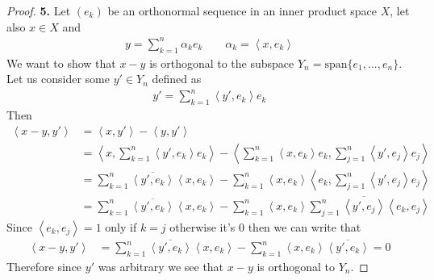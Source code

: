 \documentclass[11pt]{article}
\newcommand{\inprd}[1]{\left\langle{#1}\right\rangle}
\theoremstyle{definition}
\begin{document}
\cleardoublepage
\begin{proof}{\textbf{5.}}
Let $(e_k)$ be an orthonormal sequence in an inner product space $X$, let also
$x \in X$ and
\begin{align*}
    y = \sum_{k=1}^n \alpha_k e_k \qquad \alpha_k = \inprd{x, e_k}
\end{align*}
We want to show that $x - y$ is orthogonal to the subspace
$Y_n = \text{span}\{e_1,..., e_n\}$.
Let us consider some $y' \in Y_n$ defined as
\begin{align*}
    y' = \sum_{k=1}^n \inprd{y', e_k} e_k 
\end{align*}
Then
\begin{align*}
    \inprd{x -y, y'} &= \inprd{x, y'}  - \inprd{y, y'}\\
    &= \inprd{x, \sum_{k=1}^n \inprd{y', e_k} e_k}
    - \inprd{\sum_{k=1}^n \inprd{x, e_k} e_k, \sum_{j=1}^n \inprd{y', e_j} e_j}\\
    &= \sum_{k=1}^n \overline{\inprd{y', e_k}}\inprd{x, e_k}
    - \sum_{k=1}^n\inprd{x, e_k}\inprd{e_k, \sum_{j=1}^n \inprd{y', e_j} e_j}\\
    &= \sum_{k=1}^n \overline{\inprd{y', e_k}}\inprd{x, e_k}
    - \sum_{k=1}^n\inprd{x, e_k}\sum_{j=1}^n \overline{\inprd{y', e_j}}\inprd{e_k, e_j}
\end{align*}
Since $\inprd{e_k, e_j} = 1$ only if $k = j$ otherwise it's 0 then we can write
that
\begin{align*}
    \inprd{x -y, y'}
    &= \sum_{k=1}^n \overline{\inprd{y', e_k}}\inprd{x, e_k}
    - \sum_{k=1}^n\inprd{x, e_k} \overline{\inprd{y', e_k}}
    = 0
\end{align*}
Therefore since $y'$ was arbitrary we see that $x -y$ is orthogonal to $Y_n$.
\end{proof}
\end{document}
